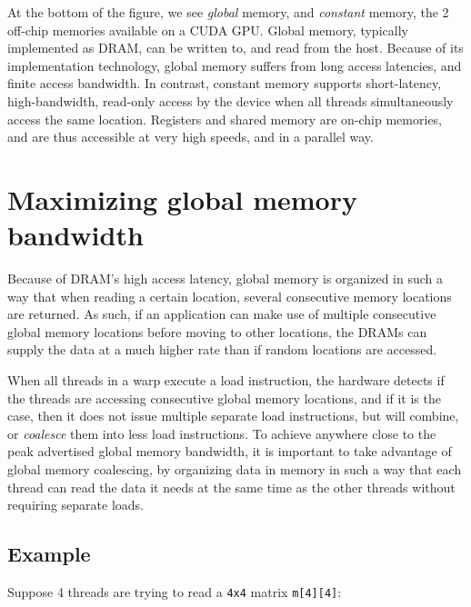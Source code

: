\documentclass[12pt, a4paper]{report}
\begin{document}
\begin{sloppypar}
At the bottom of the figure, we see \emph{global} memory, and \emph{constant}
memory, the 2 off-chip memories available on a CUDA GPU.
Global memory, typically implemented as DRAM, can be written to, and read from
the host.
Because of its implementation technology, global memory suffers from long access
latencies, and finite access bandwidth.
In contrast, constant memory supports short-latency, high-bandwidth, read-only
access by the device when all threads simultaneously access the same location.
Registers and shared memory are on-chip memories, and are thus accessible at
very high speeds, and in a parallel way.

\section{Maximizing global memory bandwidth}
Because of DRAM's high access latency, global memory is organized in such a way
that when reading a certain location, several consecutive memory locations are
returned.
As such, if an application can make use of multiple consecutive global memory locations
before moving to other locations, the DRAMs can supply the data at a much higher
rate than if random locations are accessed.

When all threads in a warp execute a load instruction, the hardware detects if
the threads are accessing consecutive global memory locations, and if it is the
case, then it does not issue multiple separate load instructions, but will
combine, or \emph{coalesce} them into less load instructions.
To achieve anywhere close to the peak advertised global memory bandwidth, it is
important to take advantage of global memory coalescing, by organizing data in
memory in such a way that each thread can read the data it needs at the same
time as the other threads without requiring separate loads.

\subsection{Example}
Suppose 4 threads are trying to read a \verb+4x4+ matrix \verb+m[4][4]+:


\end{sloppypar}
\end{document}
